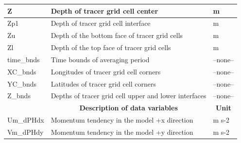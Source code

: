\begin{longtable}{|m{}|m{}|m{}|}
Z &Depth of tracer grid cell center &m  \\ \hline
Zp1 &Depth of tracer grid cell interface &m  \\ \hline
Zu &Depth of the bottom face of tracer grid cells &m  \\ \hline
Zl &Depth of the top face of tracer grid cells &m  \\ \hline
time\_bnds &Time bounds of averaging period &--none--  \\ \hline
XC\_bnds &Longitudes of tracer grid cell corners &--none--  \\ \hline
YC\_bnds &Latitudes of tracer grid cell corners &--none--  \\ \hline
Z\_bnds &Depths of tracer grid cell upper and lower interfaces &--none--  \\ \hline
\rowcolor{lightgray} \multicolumn{1}{|c|}{\textbf{Variables}} & \multicolumn{1}{|c|}{\textbf{Description of data variables}} &  \multicolumn{1}{|c|}{\textbf{Unit}}\\ \hline
Um\_dPHdx &Momentum tendency in the model +x direction &m s-2  \\ \hline
Vm\_dPHdy &Momentum tendency in the model +y direction &m s-2  \\ \hline
\end{longtable}

\newp
\pagebreak
